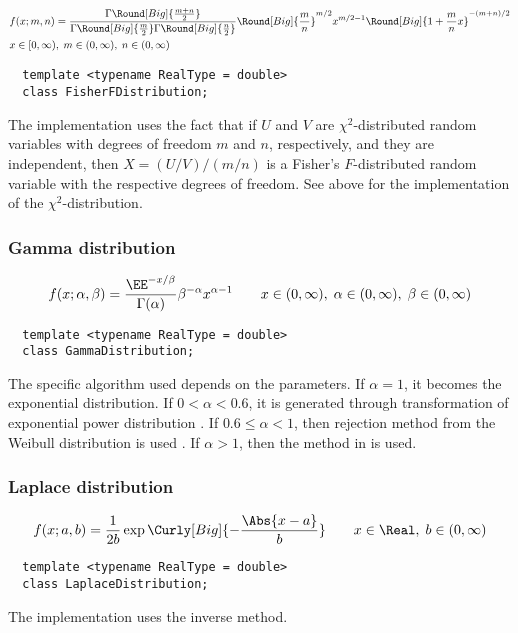 \begin{align*}
  & f(x;m,n) =
  \frac{\Gamma\Round[Big]{\frac{m + n}{2}}}{
    \Gamma\Round[Big]{\frac{m}{2}}\Gamma\Round[Big]{\frac{n}{2}}}
  \Round[Big]{\frac{m}{n}}^{m/2} x^{m / 2 - 1}
  \Round[Big]{1 + \frac{m}{n}x}^{-(m + n) / 2} \\
  & x \in [0, \infty),\; m \in (0, \infty),\; n \in (0, \infty)
\end{align*}
\begin{Verbatim}
  template <typename RealType = double>
  class FisherFDistribution;
\end{Verbatim}
The implementation uses the fact that if $U$ and $V$ are $\chi^2$-distributed
random variables with degrees of freedom $m$ and $n$, respectively, and they
are independent, then $X = (U / V) / (m / n)$ is a Fisher's $F$-distributed
random variable with the respective degrees of freedom. See above for the
implementation of the $\chi^2$-distribution.

\subsubsection{Gamma distribution}

\begin{equation*}
  f(x;\alpha,\beta) =
  \frac{\EE^{-x/\beta}}{\Gamma(\alpha)}\beta^{-\alpha}x^{\alpha-1} \qquad
  x \in (0, \infty),\; \alpha \in (0, \infty),\; \beta \in (0, \infty)
\end{equation*}
\begin{Verbatim}
  template <typename RealType = double>
  class GammaDistribution;
\end{Verbatim}
The specific algorithm used depends on the parameters. If $\alpha = 1$, it
becomes the exponential distribution. If $0 < \alpha < 0.6$, it is generated
through transformation of exponential power distribution
\parencite[sec~2.6]{Devroye:1986gi}. If $0.6\le\alpha<1$, then rejection method
from the Weibull distribution is used \parencite[sec.~3.4]{Devroye:1986gi}. If
$\alpha > 1$, then the method in \textcite{Marsaglia:2000vq} is used.

\subsubsection{Laplace distribution}

\begin{equation*}
  f(x;a,b) = \frac{1}{2b}\exp\Curly[Big]{-\frac{\Abs{x - a}}{b}} \qquad
  x \in \Real,\; b \in (0, \infty)
\end{equation*}
\begin{Verbatim}
  template <typename RealType = double>
  class LaplaceDistribution;
\end{Verbatim}
The implementation uses the inverse method.

